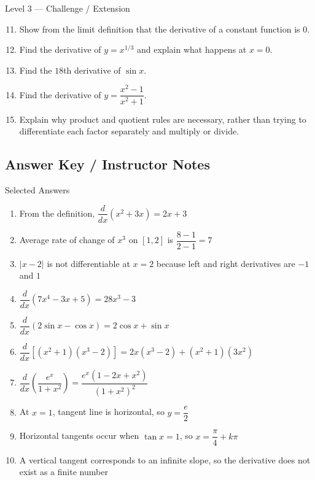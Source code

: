 \documentclass[11pt]{article}
\begin{document}
\begin{practicebox}{Level 3 --- Challenge / Extension}
\begin{enumerate}
    \setcounter{enumi}{10}
    \item Show from the limit definition that the derivative of a constant function is 0.
    \item Find the derivative of $y=x^{1/3}$ and explain what happens at $x=0$.
    \item Find the $18$th derivative of $\sin x$.
    \item Find the derivative of $y=\dfrac{x^2-1}{x^2+1}$.
    \item Explain why product and quotient rules are necessary, rather than trying to differentiate each factor separately and multiply or divide.
\end{enumerate}
\end{practicebox}

\newpage
\subsection{Answer Key / Instructor Notes}

\begin{summarybox}{Selected Answers}
\begin{enumerate}
    \item From the definition, $\dfrac{d}{dx}(x^2+3x)=2x+3$
    \item Average rate of change of $x^3$ on $[1,2]$ is $\dfrac{8-1}{2-1}=7$
    \item $|x-2|$ is not differentiable at $x=2$ because left and right derivatives are $-1$ and $1$
    \item $\dfrac{d}{dx}(7x^4-3x+5)=28x^3-3$
    \item $\dfrac{d}{dx}(2\sin x-\cos x)=2\cos x+\sin x$
    \item $\dfrac{d}{dx}[(x^2+1)(x^3-2)]=2x(x^3-2)+(x^2+1)(3x^2)$
    \item $\dfrac{d}{dx}\left(\dfrac{e^x}{1+x^2}\right)=\dfrac{e^x(1-2x+x^2)}{(1+x^2)^2}$
    \item At $x=1$, tangent line is horizontal, so $y=\dfrac{e}{2}$
    \item Horizontal tangents occur when $\tan x=1$, so $x=\dfrac{\pi}{4}+k\pi$
    \item A vertical tangent corresponds to an infinite slope, so the derivative does not exist as a finite number
\end{enumerate}
\end{summarybox}
\end{document}
